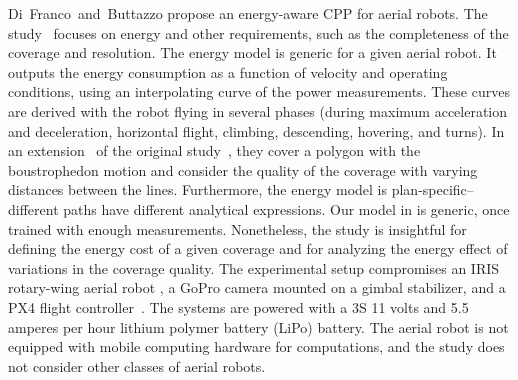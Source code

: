 Di~Franco~and~Buttazzo propose an energy-aware CPP for aerial robots. The study~\citep{difranco2015energy} focuses on energy and other requirements, such as the completeness of the coverage and resolution. The energy model is generic for a given aerial robot. It outputs the energy consumption as a function of velocity and operating conditions, using an interpolating curve of the power measurements. These curves are derived with the robot flying in several phases (during maximum acceleration and deceleration, horizontal flight, climbing, descending, hovering, and turns). %
In an extension~\citep{difranco2016coverage} of the original study~\citep{difranco2015energy}, they cover a polygon with the boustrophedon motion and consider the quality of the coverage with varying distances between the lines. %
Furthermore, the energy model is plan-specific--different paths have different analytical expressions. Our model in  is generic, once trained with enough measurements. Nonetheless, the study is insightful for defining the energy cost of a given coverage and for analyzing the energy effect of variations in the coverage quality. The experimental setup compromises an IRIS rotary-wing aerial robot%
, a GoPro camera mounted on a gimbal stabilizer, and a PX4 flight controller~\citep{px4}. The systems are powered with a 3S 11 volts and 5.5 amperes per hour lithium polymer battery (LiPo) battery. The aerial robot is not equipped with mobile computing hardware for computations, and the study does not consider other classes of aerial robots.

